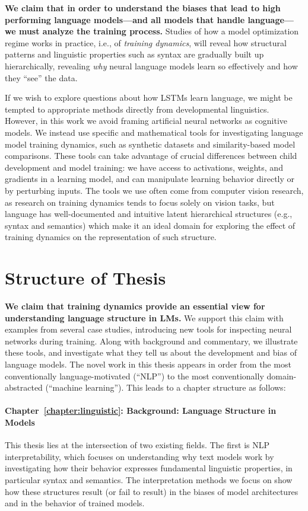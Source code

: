 \textbf{We claim that in order to understand the biases that lead to high performing language models---and all models that handle language---we must analyze the training process.} Studies of how a model optimization regime works in practice, i.e., of \textit{training dynamics}, will reveal how structural patterns and linguistic properties such as syntax are gradually built up hierarchically, revealing \textit{why} neural language models learn so effectively and how they ``see'' the data.

If we wish to explore questions about how LSTMs learn language, we might be tempted to appropriate methods directly from developmental linguistics. However, in this work we avoid framing artificial neural networks as cognitive models. We instead use specific and mathematical tools for investigating language model training dynamics, such as synthetic datasets and similarity-based model comparisons. These tools can take advantage of crucial differences between child development and model training: we have access to activations, weights, and gradients in a learning model, and can manipulate learning behavior directly or by perturbing inputs. The tools we use often come from computer vision research, as research on training dynamics tends to focus solely on vision tasks, but language has well-documented and intuitive latent hierarchical structures (e.g., syntax and semantics) which make it an ideal domain for exploring the effect of training dynamics on the representation of such structure.

\section{Structure of Thesis}

\textbf{We claim that training dynamics provide an essential view for understanding language structure in LMs.} We support this claim with examples from several case studies, introducing new tools for inspecting neural networks during training. Along with background and commentary, we illustrate these tools, and investigate what they tell us about the development and bias of language models. The novel work in this thesis appears in order from the most conventionally language-motivated (``NLP'') to the most conventionally domain-abstracted (``machine learning''). This leads to a chapter structure as follows:

\paragraph*{Chapter~\ref{chapter:linguistic}: Background: Language Structure in Models} This thesis lies at the intersection of two existing fields. The first is NLP interpretability, which focuses on understanding why text models work by investigating how their behavior expresses fundamental linguistic properties, in particular syntax and semantics. The interpretation methods we focus on show how these structures result (or fail to result) in the biases of model architectures and in the behavior of trained models.

